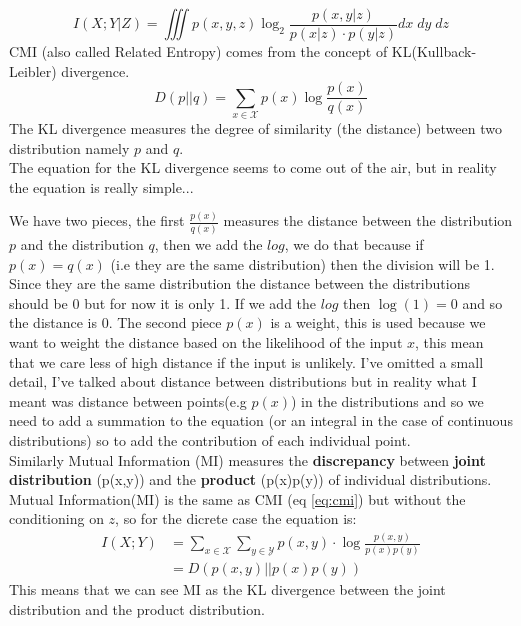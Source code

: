 \begin{equation}
    I(X;Y|Z)=\iiint{p(x,y,z)\log_2{\frac{p(x, y| z)}{p(x|z)\cdot p(y|z)}}dx\;dy\;dz}
    \label{eq:cmi}
\end{equation}
CMI (also called Related Entropy) comes from the concept of KL(Kullback-Leibler) divergence.
\begin{equation}
    D(p||q)=\sum_{x\in\mathcal{X}}p(x)\log{\frac{p(x)}{q(x)}}
\end{equation}
The KL divergence measures the degree of similarity (the distance) between two distribution namely $p$ and $q$.\\

The equation for the KL divergence seems to come out of the air, but in reality the equation is really simple...

We have two pieces, the first $\frac{p(x)}{q(x)}$ measures the distance between 
the distribution $p$ and the distribution $q$, then we add the $log$, we do that 
because if $p(x)=q(x)$ (i.e they are the same distribution) then the division will 
be 1. Since they are the same distribution the distance between the distributions should be 0 but for now it is only 1. 
If we add the $log$ then $\log(1)=0$ and so the distance is 0. The second piece $p(x)$ is a weight, this 
is used because we want to weight the distance based on the likelihood of the input
 $x$, this mean that we care less of high distance if the input is unlikely.
I've omitted a small detail, I've talked about distance between distributions 
but in reality what I meant was distance between points(e.g $p(x)$) in the 
distributions and so we need to add a summation to the equation 
(or an integral in the case of continuous distributions) so to add the contribution
 of each individual point.\\

Similarly Mutual Information (MI) measures the \textbf{discrepancy} between \textbf{joint distribution} (p(x,y)) and the \textbf{product} (p(x)p(y)) of individual distributions.
Mutual Information(MI) is the same as CMI (eq \ref{eq:cmi}) but without the conditioning on $z$, so for the dicrete case the equation is:
\begin{equation}\label{eq:mi_disc}
    \begin{split}
        I(X;Y)&=\sum_{x\in\mathcal{X}}\sum_{y\in\mathcal{Y}}p(x,y)\cdot\log{\frac{p(x,y)}{p(x)p(y)}}\\
        &=D(p(x,y)||p(x)p(y))
    \end{split}
\end{equation}
This means that we can see MI as the KL divergence between the joint distribution and the product distribution.

